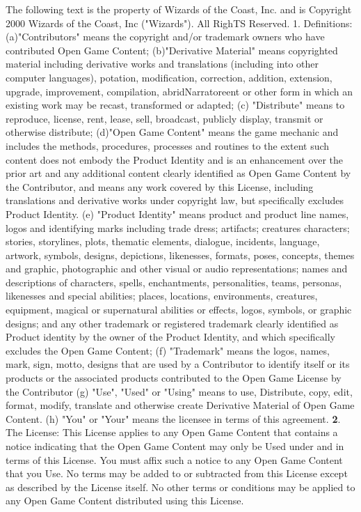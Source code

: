 \documentclass[a4paper,11pt,twoside,openany]{book}
\begin{document}
{{The following text is the property of Wizards of the Coast, Inc. and is Copyright 2000 Wizards of the Coast, Inc ("Wizards"). All RighTS Reserved.
1. Definitions: (a)"Contributors" means the copyright and/or trademark owners who have contributed Open Game Content; (b)"Derivative Material" means copyrighted material including derivative works and translations (including into other computer languages), potation, modification, correction, addition, extension, upgrade, improvement, compilation, abridNarratoreent or other form in which an existing work may be recast, transformed or adapted; (c) "Distribute" means to reproduce, license, rent, lease, sell, broadcast, publicly display, transmit or otherwise distribute; (d)"Open Game Content" means the game mechanic and includes the methods, procedures, processes and routines to the extent such content does not embody the Product Identity and is an enhancement over the prior art and any additional content clearly identified as Open Game Content by the Contributor, and means any work covered by this License, including translations and derivative works under copyright law, but specifically excludes Product Identity. (e) "Product Identity" means product and product line names, logos and identifying marks including trade dress; artifacts; creatures characters; stories, storylines, plots, thematic elements, dialogue, incidents, language, artwork, symbols, designs, depictions, likenesses, formats, poses, concepts, themes and graphic, photographic and other visual or audio representations; names and descriptions of characters, spells, enchantments, personalities, teams, personas, likenesses and special abilities; places, locations, environments, creatures, equipment, magical or supernatural abilities or effects, logos, symbols, or graphic designs; and any other trademark or registered trademark clearly identified as Product identity by the owner of the Product Identity, and which specifically excludes the Open Game Content; (f) "Trademark" means the logos, names, mark, sign, motto, designs that are used by a Contributor to identify itself or its products or the associated products contributed to the Open Game License by the Contributor (g) "Use", "Used" or "Using" means to use, Distribute, copy, edit, format, modify, translate and otherwise create Derivative Material of Open Game Content. (h) "You" or "Your" means the licensee in terms of this agreement.
\textbf{2}. The License: This License applies to any Open Game Content that contains a notice indicating that the Open Game Content may only be Used under and in terms of this License. You must affix such a notice to any Open Game Content that you Use. No terms may be added to or subtracted from this License except as described by the License itself. No other terms or conditions may be applied to any Open Game Content distributed using this License.
}}
\end{document}
